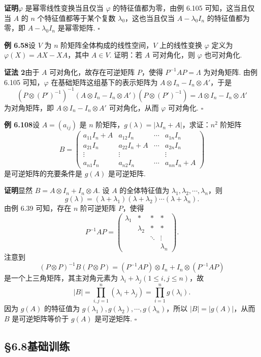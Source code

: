 \documentclass[UTF8,12pt,a4paper,fontset=fandol]{ctexart}
\begin{document}
\noindent\textbf{证明}\quad $\varphi$ 是幂零线性变换当且仅当 $\varphi$ 的特征值都为零，由例 6.105 可知，这当且仅当 $A$ 的 $n$ 个特征值都等于某个复数 $\lambda_0$，这也当且仅当 $A-\lambda_0I_n$ 的特征值都为零，即 $A-\lambda_0I_n$ 是幂零矩阵. $\square$

\noindent\textbf{例 6.58}\quad 设 $V$ 为 $n$ 阶矩阵全体构成的线性空间，$V$ 上的线性变换 $\varphi$ 定义为 $\varphi(X)=AX-XA$，其中 $A\in V$. 证明：若 $A$ 可对角化，则 $\varphi$ 也可对角化.

\noindent\textbf{证法 2}\quad 由于 $A$ 可对角化，故存在可逆矩阵 $P$，使得 $P^{-1}AP=\Lambda$ 为对角矩阵. 由例 6.105 可知，$\varphi$ 在基础矩阵这组基下的表示矩阵为 $A\otimes I_n-I_n\otimes A'$，于是
\[
(P\otimes(P')^{-1})^{-1}(A\otimes I_n-I_n\otimes A')(P\otimes(P')^{-1})=\Lambda\otimes I_n-I_n\otimes\Lambda'
\]
为对角矩阵，即 $A\otimes I_n-I_n\otimes A'$ 可对角化，从而 $\varphi$ 可对角化. $\square$

\noindent\textbf{例 6.108}\quad 设 $A=(a_{ij})$ 是 $n$ 阶矩阵，$g(\lambda)=|\lambda I_n+A|$，求证：$n^2$ 阶矩阵
\[
B=
\begin{pmatrix}
a_{11}I_n+A&a_{12}I_n&\cdots&a_{1n}I_n\\
a_{21}I_n&a_{22}I_n+A&\cdots&a_{2n}I_n\\
\vdots&\vdots&&\vdots\\
a_{n1}I_n&a_{n2}I_n&\cdots&a_{nn}I_n+A
\end{pmatrix}
\]
是可逆矩阵的充要条件是 $g(A)$ 是可逆矩阵.

\noindent\textbf{证明}\quad 显然 $B=A\otimes I_n+I_n\otimes A$. 设 $A$ 的全体特征值为 $\lambda_1,\lambda_2,\cdots,\lambda_n$，则
\[
g(\lambda)=(\lambda+\lambda_1)(\lambda+\lambda_2)\cdots(\lambda+\lambda_n).
\]
由例 6.39 可知，存在 $n$ 阶可逆矩阵 $P$，使得
\[
P^{-1}AP=
\begin{pmatrix}
\lambda_1&*&*&*\\
&\lambda_2&*&*\\
&&\ddots&\vdots\\
&&&\lambda_n
\end{pmatrix}.
\]
注意到
\[
(P\otimes P)^{-1}B(P\otimes P)=(P^{-1}AP)\otimes I_n+I_n\otimes(P^{-1}AP)
\]
是一个上三角矩阵，其主对角元素为 $\lambda_i+\lambda_j(1\le i,j\le n)$，故
\[
|B|=\prod_{i,j=1}^n(\lambda_i+\lambda_j)=\prod_{i=1}^n g(\lambda_i).
\]
因为 $g(A)$ 的特征值为 $g(\lambda_1),g(\lambda_2),\cdots,g(\lambda_n)$，所以 $|B|=|g(A)|$，从而 $B$ 是可逆矩阵等价于 $g(A)$ 是可逆矩阵. $\square$

\subsection*{§6.8\quad 基础训练}
\end{document}
